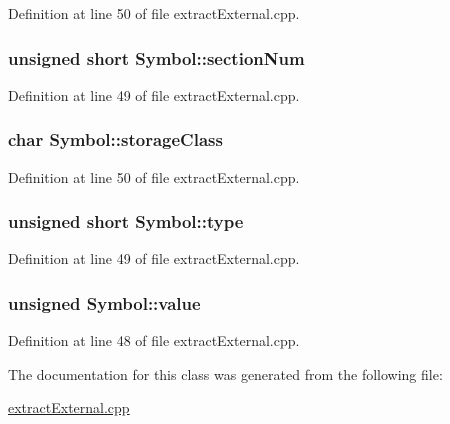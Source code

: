 Definition at line 50 of file extract\-External.\-cpp.

\hypertarget{classSymbol_a088e5306cf802c20f50738f7a6afb1a4}{
\subsubsection[{section\-Num}]{\setlength{\rightskip}{0pt plus 5cm}unsigned short Symbol\-::section\-Num}}\label{classSymbol_a088e5306cf802c20f50738f7a6afb1a4}


Definition at line 49 of file extract\-External.\-cpp.

\hypertarget{classSymbol_afea58ac21e64d497b947b39bbca39e28}{
\subsubsection[{storage\-Class}]{\setlength{\rightskip}{0pt plus 5cm}char Symbol\-::storage\-Class}}\label{classSymbol_afea58ac21e64d497b947b39bbca39e28}


Definition at line 50 of file extract\-External.\-cpp.

\hypertarget{classSymbol_a3d1c4b34c422f08939298bce745210c0}{
\subsubsection[{type}]{\setlength{\rightskip}{0pt plus 5cm}unsigned short Symbol\-::type}}\label{classSymbol_a3d1c4b34c422f08939298bce745210c0}


Definition at line 49 of file extract\-External.\-cpp.

\hypertarget{classSymbol_af145cb57db7f42d1f54b6a7dfcb46e1b}{
\subsubsection[{value}]{\setlength{\rightskip}{0pt plus 5cm}unsigned Symbol\-::value}}\label{classSymbol_af145cb57db7f42d1f54b6a7dfcb46e1b}


Definition at line 48 of file extract\-External.\-cpp.



The documentation for this class was generated from the following file\-:\begin{DoxyCompactItemize}
\item 
\hyperlink{extractExternal_8cpp}{extract\-External.\-cpp}\end{DoxyCompactItemize}
